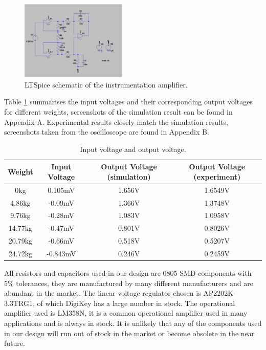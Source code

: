 \begin{figure}[h]
    \centering
    \includegraphics[width=0.45\textwidth]{final-report/assets/ltspice_sche.png}
    \caption{LTSpice schematic of the instrumentation amplifier.}
    \label{fig:ltspice_sche}
\end{figure}

Table \ref{tab:in_out_vol} summarises the input voltages and their corresponding output voltages for different weights, screenshots of the simulation result can be found in Appendix A. Experimental results closely match the simulation results, screenshots taken from the oscilloscope are found in Appendix B.

\begin{table}[h]
    \centering
    \begin{tabular}{|c|c|c|c|}
        \hline
        Weight & Input Voltage & Output Voltage (simulation) & Output Voltage (experiment) \\
        \hline
        0kg & 0.105mV & 1.656V & 1.6549V \\
        4.86kg & -0.09mV & 1.366V & 1.3748V \\
        9.76kg & -0.28mV & 1.083V & 1.0958V \\
        14.77kg & -0.47mV & 0.801V & 0.8026V \\
        20.79kg & -0.66mV & 0.518V & 0.5207V \\
        24.72kg & -0.843mV & 0.246V & 0.2459V \\
        \hline
    \end{tabular}
    \caption{Input voltage and output voltage.}
    \label{tab:in_out_vol}
\end{table}

All resistors and capacitors used in our design are 0805 SMD components with 5\% tolerances, they are manufactured by many different manufacturers and are abundant in the market. The linear voltage regulator chosen is AP2202K-3.3TRG1, of which DigiKey has a large number in stock. The operational amplifier used is LM358N, it is a common operational amplifier used in many applications and is always in stock. It is unlikely that any of the components used in our design will run out of stock in the market or become obsolete in the near future.

